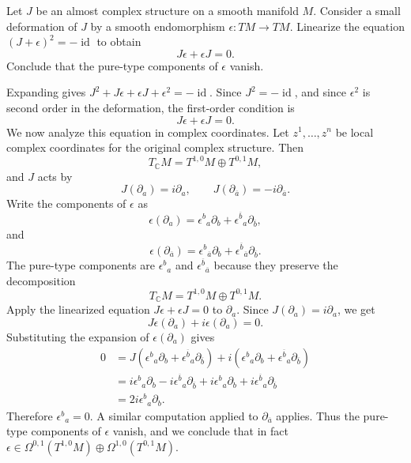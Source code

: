 \documentclass[12pt]{article}
\begin{document}
\begin{exercise}
    Let $J$ be an almost complex structure on a smooth manifold $M$. Consider a small deformation of $J$ by a smooth endomorphism $\epsilon:TM\to TM$. Linearize the equation
    $(J+\epsilon)^2=-\operatorname{id}$ to obtain
    \[
        J\epsilon+\epsilon J=0.
    \]
    Conclude that the pure-type components of $\epsilon$ vanish.
\end{exercise}

\begin{solution}
    Expanding gives $J^2+J\epsilon+\epsilon J+\epsilon^2=-\operatorname{id}$.
    Since $J^2=-\operatorname{id}$, and since $\epsilon^2$ is second order in
    the deformation, the first-order condition is
    \[
        J\epsilon+\epsilon J=0.
    \]
    We now analyze this equation in complex coordinates. Let $z^1,\ldots,z^n$
    be local complex coordinates for the original complex structure. Then
    \[
        T_{\mathbb C}M=T^{1,0}M\oplus T^{0,1}M,
    \]
    and $J$ acts by
    \[
        J(\partial_a)=i\partial_a,
        \qquad
        J(\partial_{\overline a})=-i\partial_{\overline a}.
    \]
    Write the components of $\epsilon$ as
    \[
        \epsilon(\partial_a)
        =
        \epsilon^b{}_a\partial_b
        +
        \epsilon^{\overline b}{}_a\partial_{\overline b},
    \]
    and
    \[
        \epsilon(\partial_{\overline a})
        =
        \epsilon^b{}_{\overline a}\partial_b
        +
        \epsilon^{\overline b}{}_{\overline a}\partial_{\overline b}.
    \]
    The pure-type components are $\epsilon^b{}_a$ and $\epsilon^{\overline b}{}_{\overline a}$ because they preserve the decomposition
    \[
        T_{\mathbb C}M=T^{1,0}M\oplus T^{0,1}M.
    \]
    Apply the linearized equation $J\epsilon+\epsilon J=0$
    to $\partial_a$. Since $J(\partial_a)=i\partial_a$, we get
    \[
        J\epsilon(\partial_a)+i\epsilon(\partial_a)=0.
    \]
    Substituting the expansion of $\epsilon(\partial_a)$ gives
    \begin{align*}
        0
         & =
        J\left(
        \epsilon^b{}_a\partial_b
        +
        \epsilon^{\overline b}{}_a\partial_{\overline b}
        \right)
        +
        i\left(
        \epsilon^b{}_a\partial_b
        +
        \epsilon^{\overline b}{}_a\partial_{\overline b}
        \right)                                           \\
         & =
        i\epsilon^b{}_a\partial_b
        -
        i\epsilon^{\overline b}{}_a\partial_{\overline b}
        +
        i\epsilon^b{}_a\partial_b
        +
        i\epsilon^{\overline b}{}_a\partial_{\overline b} \\
         & =
        2i\epsilon^b{}_a\partial_b.
    \end{align*}
    Therefore $\epsilon^b{}_a=0$.
    A similar computation applied to $\partial_{\overline a}$ applies. Thus the pure-type components of $\epsilon$ vanish, and we conclude that in fact $\epsilon \in \Omega^{0,1}(T^{1,0}M) \oplus \Omega^{1,0}(T^{0,1}M)$.
\end{solution}
\end{document}
